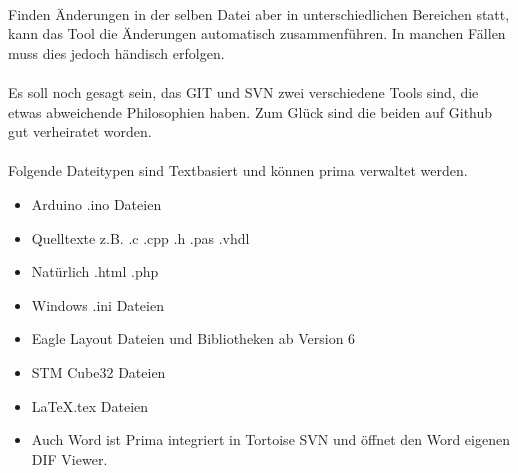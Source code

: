 \ \\
Finden Änderungen in der selben Datei aber in unterschiedlichen Bereichen statt, kann das Tool die Änderungen automatisch zusammenführen. In manchen Fällen muss dies jedoch händisch erfolgen.\\
\ \\
Es soll noch gesagt sein, das GIT und SVN zwei verschiedene Tools sind, die etwas abweichende Philosophien haben. Zum Glück sind die beiden auf Github gut verheiratet worden.\\
\ \\
Folgende Dateitypen sind Textbasiert und können prima verwaltet werden.
\begin{itemize}
\item Arduino .ino Dateien
\item Quelltexte z.B. .c .cpp .h .pas .vhdl
\item Natürlich .html .php
\item Windows .ini Dateien
\item Eagle Layout Dateien und Bibliotheken ab Version 6
\item STM Cube32 Dateien
\item \LaTeX .tex Dateien
\item Auch Word ist Prima integriert in Tortoise SVN und öffnet den Word eigenen DIF Viewer.
\end{itemize}


